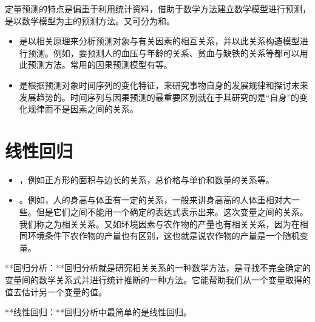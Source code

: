 \documentclass[letterpaper,10pt,english]{sphinxmanual}
\begin{document}
定量预测的特点是偏重于利用统计资料，借助于数学方法建立数学模型进行预测，是以数学模型为主的预测方法。又可分为和。
\begin{itemize}
\item {} 
是以相关原理来分析预测对象与有关因素的相互关系，并以此关系构造模型进行预测。例如，要预测人的血压与年龄的关系、贫血与缺铁的关系等都可以用此预测方法。常用的因果预测模型有等。

\item {} 
是根据预测对象时间序列的变化特征，来研究事物自身的发展规律和探讨未来发展趋势的。时间序列与因果预测的最重要区别就在于其研究的是“自身”的变化规律而不是因素之间的关系。

\end{itemize}


\section{线性回归}
\label{\detokenize{docs/prediction_model:id4}}
\begin{itemize}
\item {} 
，例如正方形的面积与边长的关系，总价格与单价和数量的关系等。

\item {} 
。例如，人的身高与体重有一定的关系，一般来讲身高高的人体重相对大一些。但是它们之间不能用一个确定的表达式表示出来。这次变量之间的关系。我们称之为相关关系。又如环境因素与农作物的产量也有相关关系，因为在相同环境条件下农作物的产量也有区别，这也就是说农作物的产量是一个随机变量。

\end{itemize}

**回归分析：**回归分析就是研究相关关系的一种数学方法，是寻找不完全确定的变量间的数学关系式并进行统计推断的一种方法。它能帮助我们从一个变量取得的值去估计另一个变量的值。

**线性回归：**回归分析中最简单的是线性回归。
\end{document}
